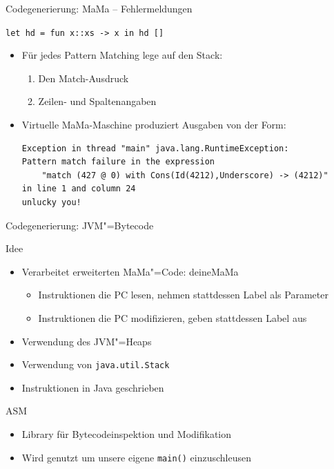 \documentclass[hyperref={pdfpagelabels=false}]{beamer}
\begin{document}
\begin{frame}[fragile]{Codegenerierung: MaMa -- Fehlermeldungen}
\begin{block}{\texttt{let hd = fun x::xs -> x in hd []}}
\begin{itemize}
\item Für jedes Pattern Matching lege auf den Stack:
\begin{enumerate}
\item Den Match-Ausdruck
\item Zeilen- und Spaltenangaben
\end{enumerate}
\item Virtuelle MaMa-Maschine produziert Ausgaben von der Form:
\begin{small}
\begin{verbatim}
Exception in thread "main" java.lang.RuntimeException: 
Pattern match failure in the expression
	"match (427 @ 0) with Cons(Id(4212),Underscore) -> (4212)"
in line 1 and column 24
unlucky you!
\end{verbatim}
\end{small}
\end{itemize}
\end{block}
\end{frame}

\begin{frame}{Codegenerierung: JVM"=Bytecode}
  \begin{block}{Idee}
    \begin{itemize}
      \item Verarbeitet erweiterten MaMa"=Code: deineMaMa
        \begin{itemize}
          \item Instruktionen die PC lesen, nehmen stattdessen Label als Parameter
          \item Instruktionen die PC modifizieren, geben stattdessen Label aus
        \end{itemize}
      \item Verwendung des JVM"=Heaps
      \item Verwendung von \texttt{java.util.Stack}
      \item Instruktionen in Java geschrieben
    \end{itemize}
  \end{block}
  \begin{block}{ASM}
    \begin{itemize}
      \item Library für Bytecodeinspektion und Modifikation
      \item Wird genutzt um unsere eigene \texttt{main()} einzuschleusen
    \end{itemize}
  \end{block}
\end{frame}
\end{document}
